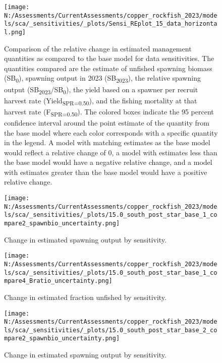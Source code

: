 \documentclass[11pt,
  english,
  letterpaper,
]{article}
\begin{document}
\newpage

\begin{figure}
\centering
\texttt{[image: N:/Assessments/CurrentAssessments/copper\_rockfish\_2023/models/sca/\_sensitivities/\_plots/Sensi\_REplot\_15\_data\_horizontal.png]}
\caption{Comparison of the relative change in estimated management quantities as compared to the base model for data sensitivities. The quantities compared are the estimate of unfished spawning biomass (SB\textsubscript{0}), spawning output in 2023 (SB\textsubscript{2023}), the relative spawning output (SB\textsubscript{2023}/SB\textsubscript{0}), the yield based on a spawner per recruit harvest rate (Yield\textsubscript{SPR=0.50}), and the fishing mortality at that harvest rate (F\textsubscript{SPR=0.50}). The colored boxes indicate the 95 percent confidence interval around the point estimate of the quantity from the base model where each color corresponds with a specific quantity in the legend. A model with matching estimates as the base model would reflect a relative change of 0, a model with estimates less than the base model would have a negative relative change, and a model with estimates greater than the base model would have a positive relative change.\label{fig:sens-data}}
\end{figure}

\newpage

\begin{figure}
\centering
\texttt{[image: N:/Assessments/CurrentAssessments/copper\_rockfish\_2023/models/sca/\_sensitivities/\_plots/15.0\_south\_post\_star\_base\_1\_compare2\_spawnbio\_uncertainty.png]}
\caption{Change in estimated spawning output by sensitivity.\label{fig:sens-ssb-1}}
\end{figure}

\newpage

\begin{figure}
\centering
\texttt{[image: N:/Assessments/CurrentAssessments/copper\_rockfish\_2023/models/sca/\_sensitivities/\_plots/15.0\_south\_post\_star\_base\_1\_compare4\_Bratio\_uncertainty.png]}
\caption{Change in estimated fraction unfished by sensitivity.\label{fig:sens-depl-1}}
\end{figure}

\newpage

\begin{figure}
\centering
\texttt{[image: N:/Assessments/CurrentAssessments/copper\_rockfish\_2023/models/sca/\_sensitivities/\_plots/15.0\_south\_post\_star\_base\_2\_compare2\_spawnbio\_uncertainty.png]}
\caption{Change in estimated spawning output by sensitivity.\label{fig:sens-ssb-2}}
\end{figure}
\end{document}
